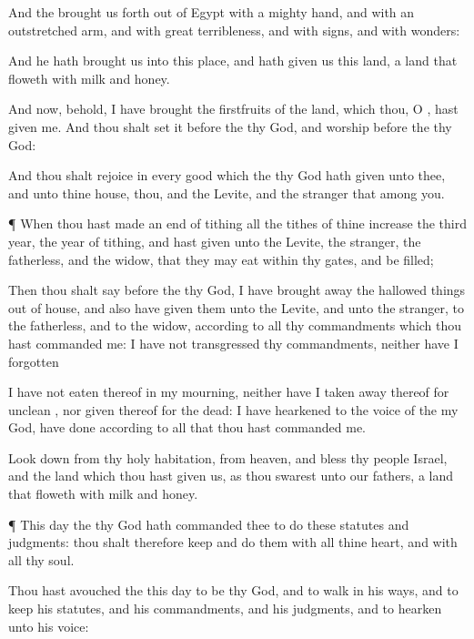 {And the
{} brought us
forth out of
Egypt with a
mighty
hand, and with an
outstretched
arm, and with
great
terribleness, and with
signs, and with
wonders:

And he hath
brought us into this
place, and hath
given us this
land,
{} a
land that
floweth with
milk and
honey.

And now, behold, I have
brought the
firstfruits of the
land, which thou, O
{}, hast
given me. And thou shalt
set it
before the
{} thy
God, and
worship
before the
{} thy
God:

And thou shalt
rejoice in every
good
{} which the
{} thy
God hath
given unto thee, and unto thine
house, thou, and the
Levite, and the
stranger that
{}
among you.


\par }{\PP {}¶ When thou hast made an
end of
tithing all the
tithes of thine
increase the
third
year,
{} the
year of
tithing, and hast
given
{} unto the
Levite, the
stranger, the
fatherless, and the
widow, that they may
eat within thy
gates, and be
filled;

Then thou shalt
say
before the
{} thy
God, I have brought
away the hallowed
things out of
{}
house, and also have
given them unto the
Levite, and unto the
stranger, to the
fatherless, and to the
widow, according to all thy
commandments which thou hast
commanded me: I have not
transgressed thy
commandments, neither have I
forgotten
{}

I have not
eaten thereof in my
mourning, neither have I taken
away
{} thereof for
{}
unclean
{}, nor
given
{} thereof for the
dead:
{} I have
hearkened to the
voice of the
{} my
God,
{} have
done according to all that thou hast
commanded me.

Look
down from thy
holy
habitation, from
heaven, and
bless thy
people
Israel, and the
land which thou hast
given us, as thou
swarest unto our
fathers, a
land that
floweth with
milk and
honey.


\par }{\PP {}¶ This
day the
{} thy
God hath
commanded thee to
do these
statutes and
judgments: thou shalt therefore
keep and
do them with all thine
heart, and with all thy
soul.

Thou hast
avouched the
{} this
day to be thy
God, and to
walk in his
ways, and to
keep his
statutes, and his
commandments, and his
judgments, and to
hearken unto his
voice:

}
